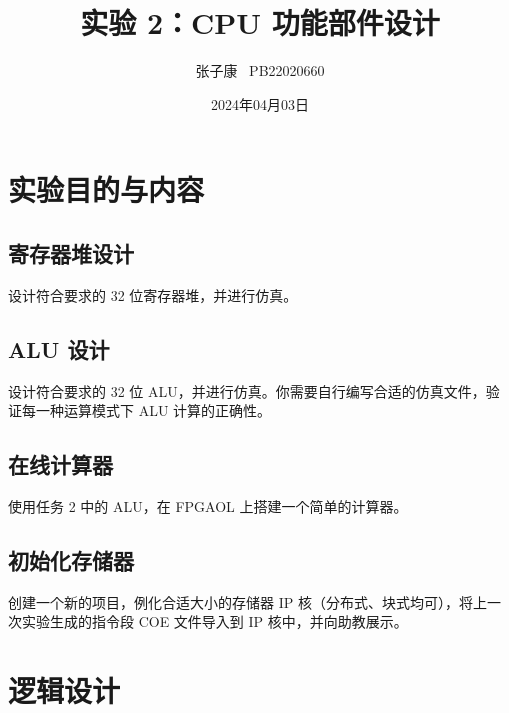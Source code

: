 \documentclass[12pt,a4paper]{ctexart}
\title{实验 2：CPU 功能部件设计}
\author{张子康 \ PB22020660}
\date{2024年04月03日}
\begin{document}
\maketitle
\newpage
\section{实验目的与内容}
\subsection{寄存器堆设计}
设计符合要求的 32 位寄存器堆，并进行仿真。
\subsection{ALU 设计}
设计符合要求的 32 位 ALU，并进行仿真。你需要自行编写合适的仿真文件，验证每一种运算模式下 ALU 计算的正确性。
\subsection{在线计算器}
使用任务 2 中的 ALU，在 FPGAOL 上搭建一个简单的计算器。
\subsection{初始化存储器}
创建一个新的项目，例化合适大小的存储器 IP 核（分布式、块式均可），将上一次实验生成的指令段 COE 文件导入到 IP 核中，并向助教展示。
\section{逻辑设计}
\end{document}
